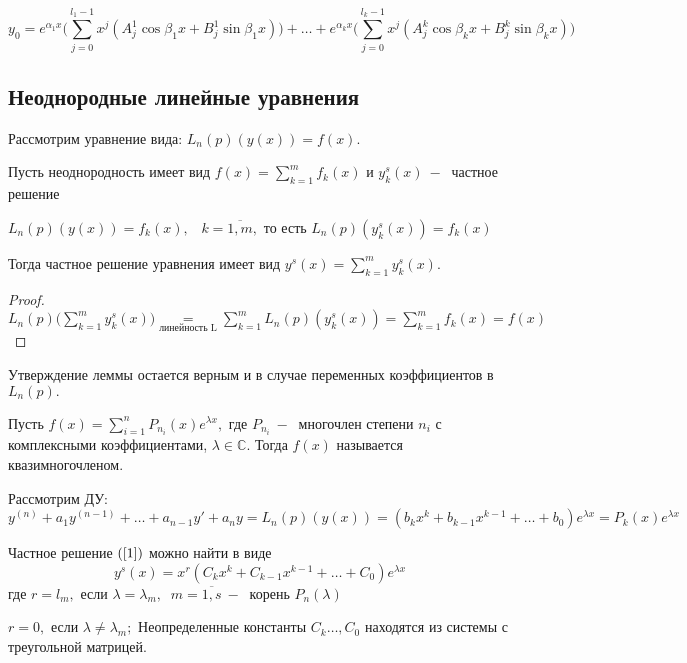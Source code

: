 \begin{equation}
    \tag{2.7}
    \label{2.7}
    y_0=e^{\alpha_1x}\Big(\displaystyle\sum_{j=0}^{l_1-1}x^j(A^1_j\cos{\beta_1x}+B^1_j\sin{\beta_1x})\Big)+\dots +e^{\alpha_kx}\Big(\displaystyle\sum_{j=0}^{l_k-1}x^j(A_j^k\cos{\beta_kx}+B_j^k\sin{\beta_kx})\Big)
\end{equation}
\subsection{Неоднородные линейные уравнения}
Рассмотрим уравнение вида: $L_n(p)(y(x))=f(x)$.
\begin{lemma}
Пусть неоднородность имеет вид $f(x)=\displaystyle\sum_{k=1}^mf_k(x)$ и $y_k^s(x)~-~$ частное решение\par $L_n(p)(y(x))=f_k(x), \;\;\;k=\overline{1, m},$ то есть $L_n(p)(y^s_k(x))=f_k(x)$\par
Тогда частное решение уравнения имеет вид $y^s(x)=\displaystyle\sum_{k=1}^my_k^s(x).$
\end{lemma}
\begin{proof}
$L_n(p)\Big(\displaystyle\sum_{k=1}^my_k^s(x)\Big)\underset{\text{линейность L}}{=} \displaystyle\sum_{k=1}^mL_n(p)(y^s_k(x))=\displaystyle\sum_{k=1}^mf_k(x)=f(x)$
\end{proof}
\begin{remark}
Утверждение леммы остается верным и в случае переменных коэффициентов в $L_n(p).$
\end{remark}
\begin{definition}
Пусть $f(x)=\displaystyle\sum_{i=1}^nP_{n_i}(x)e^{\lambda x},$ где $P_{n_i}~-~$ многочлен степени $n_i$ с комплексными коэффициентами, $\lambda \in \mathds{C}$. Тогда $f(x)$ называется квазимногочленом.
\end{definition}
Рассмотрим ДУ:
\begin{equation}
    \tag{1}
    \label{1}
    y^{(n)}+a_1y^{(n-1)}+\dots+ a_{n-1} y' + a_ny=L_n(p)(y(x))=(b_kx^k+b_{k-1}x^{k-1}+\dots + b_0)e^{\lambda x}=P_k(x)e^{\lambda x}
\end{equation}
\begin{theorem}
Частное решение $(\ref{1})$ можно найти в виде \begin{equation}
    \tag{2}
    \label{2}
    y^s(x)=x^r(C_kx^k+C_{k-1}x^{k-1}+\dots + C_0)e^{\lambda x}
\end{equation}
где $r=l_m,$ если $\lambda=\lambda_m, \;\;m=\overline{1, s}~-~$ корень $P_n(\lambda)$\par
$r=0,$ если $\lambda\neq \lambda_m;$ Неопределенные константы $C_k\dots, C_0$ находятся из системы с треугольной матрицей.
\end{theorem}
